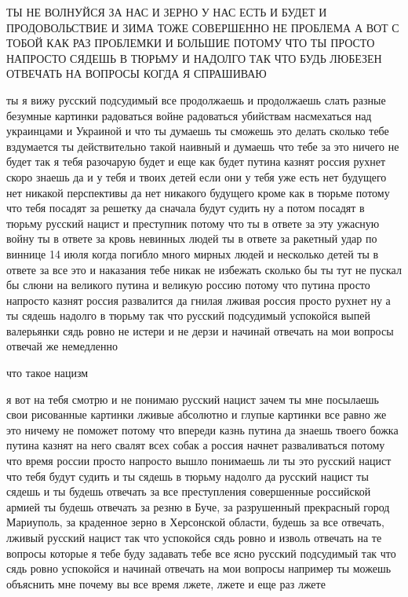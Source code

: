 ТЫ НЕ ВОЛНУЙСЯ ЗА НАС И ЗЕРНО У НАС ЕСТЬ И БУДЕТ И ПРОДОВОЛЬСТВИЕ И ЗИМА ТОЖЕ
СОВЕРШЕННО НЕ ПРОБЛЕМА А ВОТ С ТОБОЙ КАК РАЗ ПРОБЛЕМКИ И БОЛЬШИЕ ПОТОМУ ЧТО ТЫ
ПРОСТО НАПРОСТО СЯДЕШЬ В ТЮРЬМУ И НАДОЛГО ТАК ЧТО БУДЬ ЛЮБЕЗЕН ОТВЕЧАТЬ НА
ВОПРОСЫ КОГДА Я СПРАШИВАЮ



ты я вижу русский подсудимый все продолжаешь и продолжаешь слать разные
безумные картинки радоваться войне радоваться убийствам насмехаться над
украинцами и Украиной и что ты думаешь ты сможешь это делать сколько тебе
вздумается ты действительно такой наивный и думаешь что тебе за это ничего не
будет так я тебя разочарую будет и еще как будет путина казнят россия рухнет
скоро знаешь да и у тебя и твоих детей если они у тебя уже есть нет будущего
нет никакой перспективы да нет никакого будущего кроме как в тюрьме потому что
тебя посадят за решетку да сначала будут судить ну а потом посадят в тюрьму
русский нацист и преступник потому что ты в ответе за эту ужасную войну ты в
ответе за кровь невинных людей ты в ответе за ракетный удар по виннице 14 июля
когда погибло много мирных людей и несколько детей ты в ответе за все это и
наказания тебе никак не избежать сколько бы ты тут не пускал бы слюни на
великого путина и великую россию потому что путина просто напросто казнят
россия развалится да гнилая лживая россия просто рухнет ну а ты сядешь надолго
в тюрьму так что русский подсудимый успокойся выпей валерьянки сядь ровно не
истери и не дерзи и начинай отвечать на мои вопросы отвечай же немедленно




что такое нацизм

я вот на тебя смотрю и не понимаю русский нацист зачем ты мне посылаешь свои
рисованные картинки лживые абсолютно и глупые картинки все равно же это ничему
не поможет потому что впереди казнь путина да знаешь твоего божка путина казнят
на него свалят всех собак а россия начнет разваливаться потому что время россии
просто напросто вышло понимаешь ли ты это русский нацист что тебя будут судить
и ты сядешь в тюрьму надолго да русский нацист ты сядешь и ты будешь отвечать
за все преступления совершенные российской армией ты будешь отвечать за резню в
Буче, за разрушенный прекрасный город Мариуполь, за краденное зерно в
Херсонской области, будешь за все отвечать, лживый русский нацист так что
успокойся сядь ровно и изволь отвечать на те вопросы которые я тебе буду
задавать тебе все ясно русский подсудимый так что сядь ровно успокойся и
начинай отвечать на мои вопросы например ты можешь объяснить мне почему вы все
время лжете, лжете и еще раз лжете

